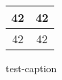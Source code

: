 \documentclass{article}
\begin{document}
\begin{figure}[t]
    \centering
\begin{tabular}{ || c || c ||}
\hline
  42 & 42 \\
\hline
\hline
  42 & 42 \\
\hline
\hline
\end{tabular}
  \caption{test-caption}
  \label{fig:test-label}
\end{figure}
\end{document}
